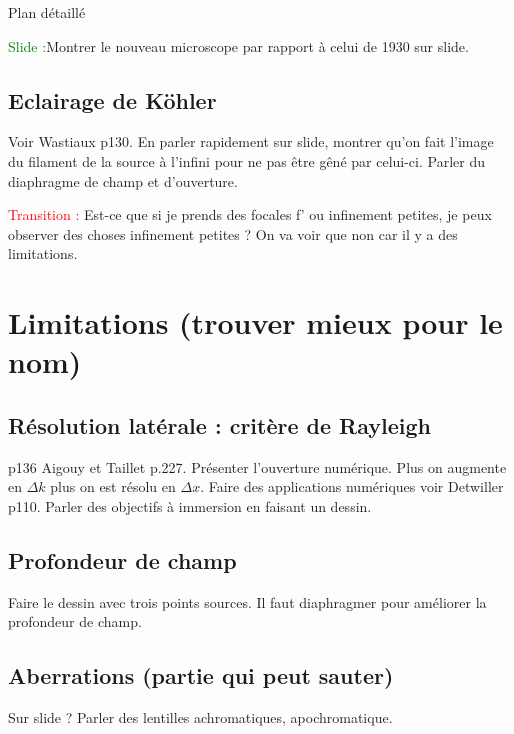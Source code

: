 \begin{reportBlock}{Plan détaillé}

  \textcolor{green}{Slide :}Montrer le nouveau microscope par rapport à celui de 1930 sur slide.
  
  \subsection{Eclairage de Köhler}
  Voir Wastiaux p130. En parler rapidement sur slide, montrer qu'on fait l'image du filament de la source à l'infini pour ne pas être gêné par celui-ci. Parler du diaphragme de champ et d'ouverture.
  
  \textcolor{red}{Transition :} Est-ce que si je prends des focales f' ou infinement petites, je peux observer des choses infinement petites ? On va voir que non car il y a des limitations.


  \section{Limitations (trouver mieux pour le nom)}

  \subsection{Résolution latérale : critère de Rayleigh}
  p136 Aigouy et Taillet p.227. Présenter l'ouverture numérique. Plus on augmente en $\Delta k$ plus on est résolu en $\Delta x$. Faire des applications numériques voir Detwiller p110. Parler des objectifs à immersion en faisant un dessin.
  
  \subsection{Profondeur de champ}
  Faire le dessin avec trois points sources. Il faut diaphragmer pour améliorer la profondeur de champ.

  \subsection{Aberrations (partie qui peut sauter)}
  Sur slide ? Parler des lentilles achromatiques, apochromatique.


\end{reportBlock}
